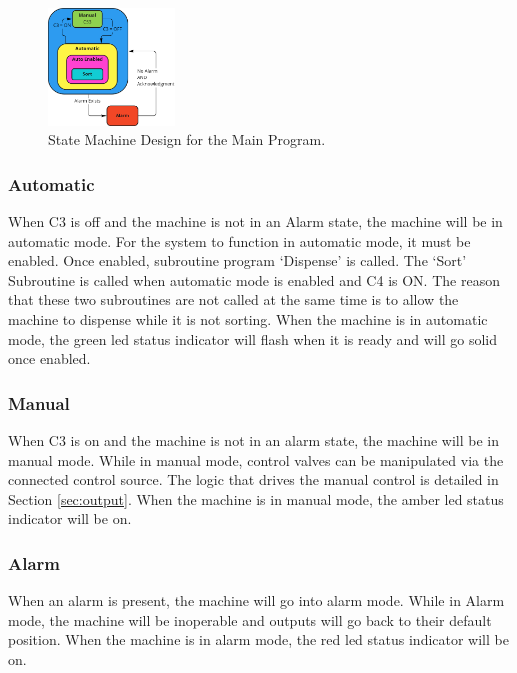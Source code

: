         \begin{figure}[H]
            \centering
            \includegraphics[width = 0.3\textwidth]{2_images/mainStateMachine}
            \caption{State Machine Design for the Main Program.}
            \label{fig:mainStateMachine}
        \end{figure}
    
        \subsubsection{Automatic}
            When C3 is off and the machine is not in an Alarm state, the machine will be in automatic mode. For the system to function in automatic mode, it must be enabled.  Once enabled, subroutine program `Dispense' is called. The `Sort' Subroutine is called when automatic mode is enabled and C4 is ON. The reason that these two subroutines are not called at the same time is to allow the machine to dispense while it is not sorting. 
            When the machine is in automatic mode, the green \acrshort{led} status indicator will flash when it is ready and will go solid once enabled.

        \subsubsection{Manual}
            When C3 is on and the machine is not in an alarm state, the machine will be in manual mode. While in manual mode, control valves can be manipulated via the connected control source. The logic that drives the manual control is detailed in Section \ref{sec:output}.
            When the machine is in manual mode, the amber \acrshort{led} status indicator will be on. 

        \subsubsection{Alarm}
            When an alarm is present, the machine will go into alarm mode. While in Alarm mode, the machine will be inoperable and outputs will go back to their default position. When the machine is in alarm mode, the red \acrshort{led} status indicator will be on.

